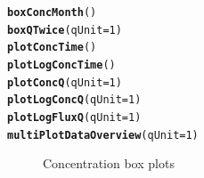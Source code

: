 \documentclass[a4paper,11pt]{article}\usepackage{graphicx, color}
\makeatletter
\newcommand{\hlfunctioncall}[1]{\textcolor[rgb]{0.501960784313725,0,0.329411764705882}{\textbf{#1}}}%
\newenvironment{kframe}{%
 \def\at@end@of@kframe{}%
 \ifinner\ifhmode%
  \def\at@end@of@kframe{\end{minipage}}%
  \begin{minipage}{\columnwidth}%
 \fi\fi%
 \def\FrameCommand##1{\hskip\@totalleftmargin \hskip-\fboxsep
 \colorbox{shadecolor}{##1}\hskip-\fboxsep
     \hskip-\linewidth \hskip-\@totalleftmargin \hskip\columnwidth}%
 \MakeFramed {\advance\hsize-\width
   \@totalleftmargin\z@ \linewidth\hsize
   \@setminipage}}%
 {\par\unskip\endMakeFramed%
 \at@end@of@kframe}
\newenvironment{knitrout}{}{} %
\makeatother
\begin{document}
\begin{knitrout}
\color{fgcolor}\begin{kframe}
\begin{alltt}
\hlfunctioncall{boxConcMonth}()
\hlfunctioncall{boxQTwice}(qUnit=1)
\hlfunctioncall{plotConcTime}()
\hlfunctioncall{plotLogConcTime}()
\hlfunctioncall{plotConcQ}(qUnit=1)
\hlfunctioncall{plotLogConcQ}(qUnit=1)
\hlfunctioncall{plotLogFluxQ}(qUnit=1)
\hlfunctioncall{multiPlotDataOverview}(qUnit=1)
\end{alltt}
\end{kframe}
\end{knitrout}


\begin{knitrout}
\color{fgcolor}\begin{figure}[]
\caption[Concentration box plots]{Concentration box plots\label{fig:plotBoxes}}
\end{figure}


\end{knitrout}
\end{document}
